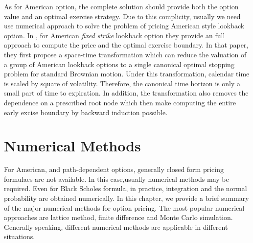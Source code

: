 \documentclass[11pt]{book}
\begin{document}
As for American option, the complete solution should provide both the option value and an optimal exercise strategy. Due to this complicity, usually we need use numerical approach to solve the problem of pricing American style lookback option. In \cite{Lim2004}, for American \emph {fixed strike} lookback option they provide an full approach to compute the price and the optimal exercise boundary. In that paper, they first propose a space-time transformation which can reduce the valuation of a group of American lookback options to a single canonical optimal stopping problem for standard Brownian motion. Under this transformation, calendar time is scaled by square of volatility. Therefore, the canonical time horizon is only a small part of time to expiration. In addition, the transformation also removes the dependence on a prescribed root node which then make computing the entire early excise boundary by backward induction possible.


\chapter{Numerical Methods}

For American, and path-dependent options, generally closed form pricing formulaes are not available. In this case,usually numerical methods may be required. Even for Black Scholes formula, in practice, integration and the normal probability are obtained numerically. In this chapter, we provide a brief summary of the major numerical methods for option pricing. The most popular numerical approaches are lattice method, finite difference and Monte Carlo simulation. Generally speaking, different numerical methods are applicable in different situations. 
\end{document}
